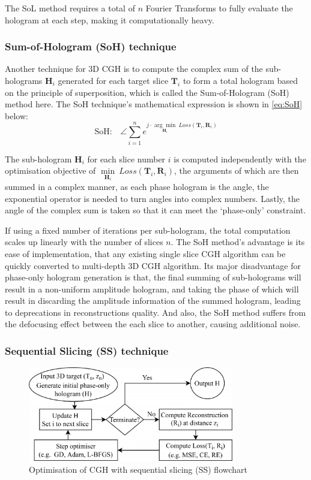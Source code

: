 The SoL method requires a total of $n$ Fourier Transforms to fully evaluate the hologram at each step, making it computationally heavy.

\subsubsection{Sum-of-Hologram (SoH) technique}
Another technique for 3D CGH is to compute the complex sum of the sub-holograms $\textbf{H}_i$ generated for each target slice $\textbf{T}_i$ to form a total hologram based on the principle of superposition, which is called the Sum-of-Hologram (SoH) method here. The SoH technique's mathematical expression is shown in \cref{eq:SoH} below:
\begin{equation}
	\text{SoH:}\quad \angle \sum_{i = 1}^{n} e^{j \cdot \underset{\textbf{H}_i}{\arg \min}\ Loss(\textbf{T}_i, \textbf{R}_i)}
	\label{eq:SoH}
\end{equation}

The sub-hologram $\textbf{H}_i$ for each slice number $i$ is computed independently with the optimisation objective of $\underset{\textbf{H}_i}{\min}\ Loss(\textbf{T}_i, \textbf{R}_i)$, the arguments of which are then summed in a complex manner, as each phase hologram is the angle, the exponential operator is needed to turn angles into complex numbers. Lastly, the angle of the complex sum is taken so that it can meet the `phase-only' constraint.

If using a fixed number of iterations per sub-hologram, the total computation scales up linearly with the number of slices $n$. The SoH method's advantage is its ease of implementation, that any existing single slice CGH algorithm can be quickly converted to multi-depth 3D CGH algorithm. Its major disadvantage for phase-only hologram generation is that, the final summing of sub-holograms will result in a non-uniform amplitude hologram, and taking the phase of which will result in discarding the amplitude information of the summed hologram, leading to deprecations in reconstructions quality. And also, the SoH method suffers from the defocusing effect between the each slice to another, causing additional noise.

\subsubsection{Sequential Slicing (SS) technique}
\begin{figure}[H]
	\centering
	\includegraphics[width=0.8\textwidth]{optim3d-cgh-flowchart}
	\caption{Optimisation of CGH with sequential slicing (SS) flowchart}
	\label{fig:optim3d-cgh-flowchart}
\end{figure}

